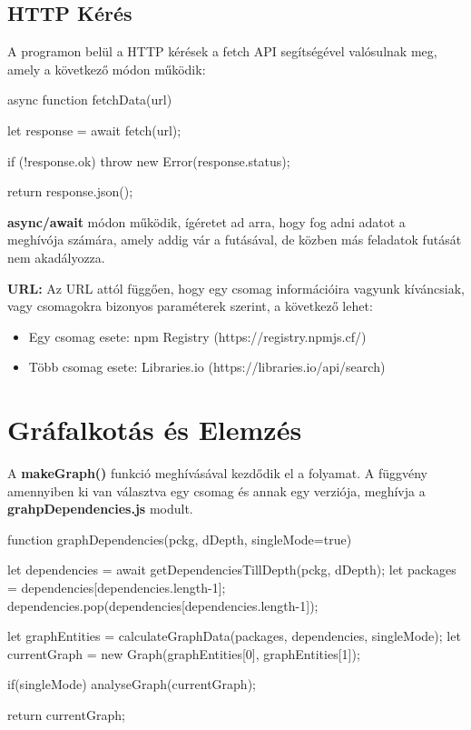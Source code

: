 \pagebreak

\subsection{HTTP Kérés}

A programon belül a HTTP kérések a fetch API segítségével valósulnak meg, amely a következő módon működik:

\begin{cpp}
async function fetchData(url){
	let response = await fetch(url);
	
	if (!response.ok) {
		throw new Error(response.status);
	}
	
	return response.json();
}
\end{cpp}

\textbf{async/await} módon működik, ígéretet ad arra, hogy fog adni adatot a meghívója számára, amely addig vár a futásával, de közben más feladatok futását nem akadályozza.

\textbf{URL:} Az URL attól függően, hogy egy csomag információira vagyunk kíváncsiak, vagy csomagokra bizonyos paraméterek szerint, a következő lehet:
\begin{itemize}
	\item Egy csomag esete: npm Registry (https://registry.npmjs.cf/)
	\item Több csomag esete: Libraries.io (https://libraries.io/api/search)
\end{itemize} 

\section{Gráfalkotás és Elemzés}

A \textbf{makeGraph()} funkció meghívásával kezdődik el a folyamat. A függvény amennyiben ki van választva egy csomag és annak egy verziója, meghívja a \textbf {grahpDependencies.js} modult. 

\begin{cpp}
function graphDependencies(pckg, dDepth, singleMode=true){
	
	let dependencies = await getDependenciesTillDepth(pckg, dDepth);
	let packages = dependencies[dependencies.length-1];
	dependencies.pop(dependencies[dependencies.length-1]);
	
	let graphEntities = 
		calculateGraphData(packages, dependencies, singleMode);
	let currentGraph = 
		new Graph(graphEntities[0], graphEntities[1]);
	
	if(singleMode){
		analyseGraph(currentGraph);
	}
	
	return currentGraph;
}	
\end{cpp}

